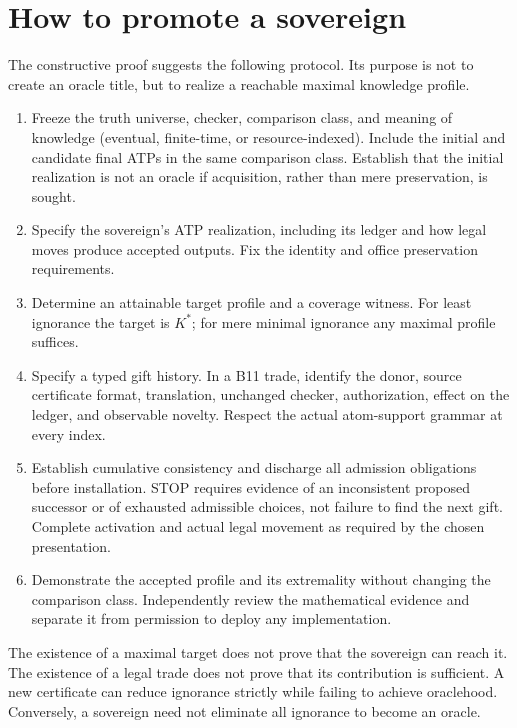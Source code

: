 \documentclass[11pt]{article}
\theoremstyle{definition}\newtheorem{definition}[theorem]{Definition}
\begin{document}
\section{How to promote a sovereign}
The constructive proof suggests the following protocol. Its purpose is not to create an oracle title, but to realize a reachable maximal knowledge profile.
\begin{enumerate}
\item Freeze the truth universe, checker, comparison class, and meaning of knowledge (eventual, finite-time, or resource-indexed). Include the initial and candidate final ATPs in the same comparison class. Establish that the initial realization is not an oracle if acquisition, rather than mere preservation, is sought.
\item Specify the sovereign's ATP realization, including its ledger and how legal moves produce accepted outputs. Fix the identity and office preservation requirements.
\item Determine an attainable target profile and a coverage witness. For least ignorance the target is $K^*$; for mere minimal ignorance any maximal profile suffices.
\item Specify a typed gift history. In a B11 trade, identify the donor, source certificate format, translation, unchanged checker, authorization, effect on the ledger, and observable novelty. Respect the actual atom-support grammar at every index.
\item Establish cumulative consistency and discharge all admission obligations before installation. STOP requires evidence of an inconsistent proposed successor or of exhausted admissible choices, not failure to find the next gift. Complete activation and actual legal movement as required by the chosen presentation.
\item Demonstrate the accepted profile and its extremality without changing the comparison class. Independently review the mathematical evidence and separate it from permission to deploy any implementation.
\end{enumerate}
The existence of a maximal target does not prove that the sovereign can reach it. The existence of a legal trade does not prove that its contribution is sufficient. A new certificate can reduce ignorance strictly while failing to achieve oraclehood. Conversely, a sovereign need not eliminate all ignorance to become an oracle.
\end{document}
